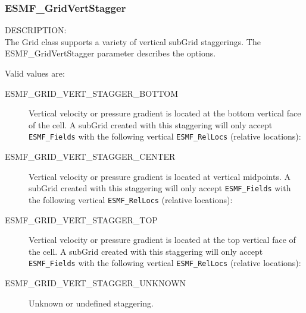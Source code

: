  \subsubsection{ESMF\_GridVertStagger}
 \label{sec:GridVertStagger}

 {\sf DESCRIPTION:\\}
 The Grid class supports a variety of vertical subGrid staggerings.  The
 {ESMF\_GridVertStagger} parameter describes the options.

 Valid values are:
 \begin{description}

    \item [ESMF\_GRID\_VERT\_STAGGER\_BOTTOM]
          Vertical velocity or pressure gradient is located at the bottom
          vertical face of the cell.  A subGrid created with this staggering
          will only accept {\tt ESMF\_Fields} with the following vertical
          {\tt ESMF\_RelLocs} (relative locations):

    \item [ESMF\_GRID\_VERT\_STAGGER\_CENTER] 
          Vertical velocity or pressure gradient is located at vertical
          midpoints.  A subGrid created with this staggering will only accept
          {\tt ESMF\_Fields} with the following vertical {\tt ESMF\_RelLocs}
          (relative locations):

    \item [ESMF\_GRID\_VERT\_STAGGER\_TOP]
          Vertical velocity or pressure gradient is located at the top vertical 
          face of the cell.  A subGrid created with this staggering will only
          accept {\tt ESMF\_Fields} with the following vertical
          {\tt ESMF\_RelLocs} (relative locations):

    \item [ESMF\_GRID\_VERT\_STAGGER\_UNKNOWN]
          Unknown or undefined staggering.

 \end{description}


